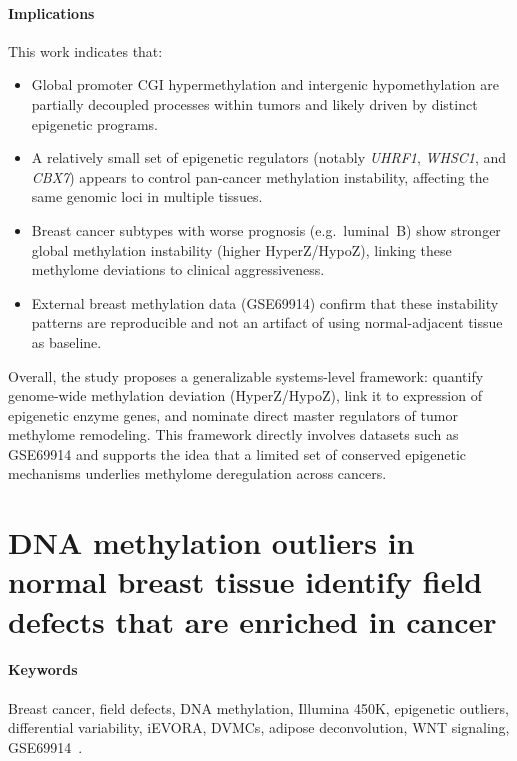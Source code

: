 \documentclass[10pt]{extarticle}
\begin{document}
\paragraph{Implications}
This work indicates that:
\begin{itemize}[label=-]
    \item Global promoter CGI hypermethylation and intergenic hypomethylation are partially decoupled processes within tumors and likely driven by distinct epigenetic programs.
    \item A relatively small set of epigenetic regulators (notably \textit{UHRF1}, \textit{WHSC1}, and \textit{CBX7}) appears to control pan-cancer methylation instability, affecting the same genomic loci in multiple tissues.
    \item Breast cancer subtypes with worse prognosis (e.g.\ luminal~B) show stronger global methylation instability (higher HyperZ/HypoZ), linking these methylome deviations to clinical aggressiveness.
    \item External breast methylation data (GSE69914) confirm that these instability patterns are reproducible and not an artifact of using normal-adjacent tissue as baseline.
\end{itemize}
Overall, the study proposes a generalizable systems-level framework: quantify genome-wide methylation deviation (HyperZ/HypoZ), link it to expression of epigenetic enzyme genes, and nominate direct master regulators of tumor methylome remodeling. This framework directly involves datasets such as GSE69914 and supports the idea that a limited set of conserved epigenetic mechanisms underlies methylome deregulation across cancers.




\section{DNA methylation outliers in normal breast tissue identify field defects that are enriched in cancer}


\paragraph{Keywords}
Breast cancer, field defects, DNA methylation, Illumina 450K, epigenetic outliers, differential variability, iEVORA, DVMCs, adipose deconvolution, WNT signaling, GSE69914~\cite{teschendorff2016fielddefects}.
\end{document}
